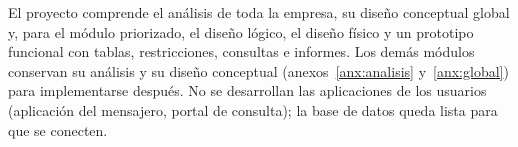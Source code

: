 
El proyecto comprende el análisis de toda la empresa, su diseño
conceptual global y, para el módulo priorizado, el diseño lógico, el
diseño físico y un prototipo funcional con tablas, restricciones,
consultas e informes. Los demás módulos conservan su análisis y su diseño
conceptual (anexos~\ref{anx:analisis} y~\ref{anx:global}) para
implementarse después. No se desarrollan las aplicaciones de los
usuarios (aplicación del mensajero, portal de consulta); la base de
datos queda lista para que se conecten.
